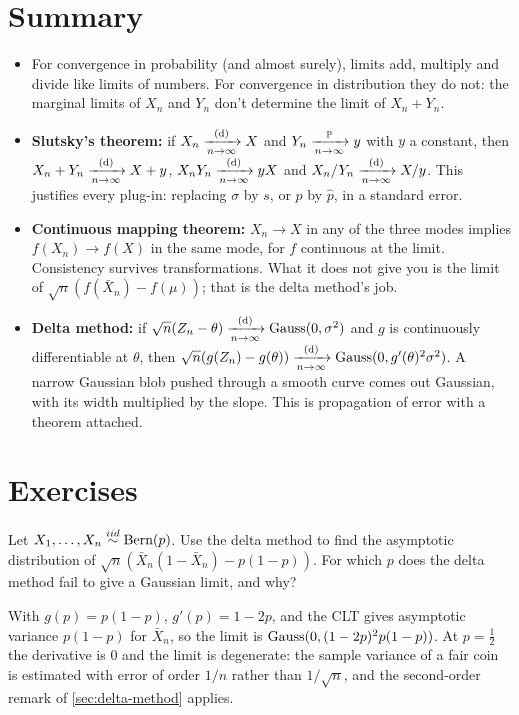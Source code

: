 \section{Summary}
\label{sec:tools-summary}

\begin{itemize}[nosep]
\item For convergence in probability (and almost surely), limits add, multiply and divide like limits of numbers. For convergence in distribution they do not: the marginal limits of $X_n$ and $Y_n$ don't determine the limit of $X_n + Y_n$.
\item \textbf{Slutsky's theorem:} if $X_n \xrightarrow [n \to \infty ]{\text{(d)}} X$ and $Y_n \xrightarrow [n \to \infty ]{\mathbb{P}} y$ with $y$ a constant, then $X_n + Y_n \xrightarrow [n \to \infty ]{\text{(d)}} X + y$, $X_n Y_n \xrightarrow [n \to \infty ]{\text{(d)}} yX$ and $X_n / Y_n \xrightarrow [n \to \infty ]{\text{(d)}} X/y$. This justifies every plug-in: replacing $\sigma$ by $s$, or $p$ by $\hat{p}$, in a standard error.
\item \textbf{Continuous mapping theorem:} $X_n \to X$ in any of the three modes implies $f(X_n) \to f(X)$ in the same mode, for $f$ continuous at the limit. Consistency survives transformations. What it does not give you is the limit of $\sqrt{n}(f(\bar{X}_n) - f(\mu))$; that is the delta method's job.
\item \textbf{Delta method:} if $\sqrt{n}(Z_n - \theta) \xrightarrow [n \to \infty ]{\text{(d)}} \text{Gauss}(0, \sigma^2)$ and $g$ is continuously differentiable at $\theta$, then $\sqrt{n}(g(Z_n) - g(\theta)) \xrightarrow [n \to \infty ]{\text{(d)}} \text{Gauss}(0, g'(\theta)^2 \sigma^2)$. A narrow Gaussian blob pushed through a smooth curve comes out Gaussian, with its width multiplied by the slope. This is propagation of error with a theorem attached.
\end{itemize}

\section{Exercises}
\label{sec:tools-exercises}

\begin{exercise}
Let $X_1, \ldots, X_n \stackrel{iid}{\sim} \text{Bern}(p)$. Use the delta method to find the asymptotic distribution of $\sqrt{n} \left( \bar{X}_n(1 - \bar{X}_n) - p(1-p) \right)$. For which $p$ does the delta method fail to give a Gaussian limit, and why?
\end{exercise}
\begin{solution}
With $g(p) = p(1-p)$, $g'(p) = 1 - 2p$, and the CLT gives asymptotic variance $p(1-p)$ for $\bar{X}_n$, so the limit is $\text{Gauss}(0, (1-2p)^2 p(1-p))$. At $p = \frac12$ the derivative is $0$ and the limit is degenerate: the sample variance of a fair coin is estimated with error of order $1/n$ rather than $1/\sqrt{n}$, and the second-order remark of \cref{sec:delta-method} applies.
\end{solution}

